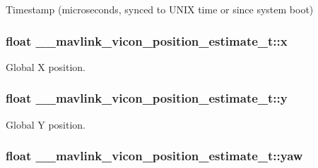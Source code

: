 Timestamp (microseconds, synced to U\+N\+I\+X time or since system boot) 

\hypertarget{struct____mavlink__vicon__position__estimate__t_a7a1c3ca07a59f990638cc4611214f2ad}{
\subsubsection[{x}]{\setlength{\rightskip}{0pt plus 5cm}float \+\_\+\+\_\+mavlink\+\_\+vicon\+\_\+position\+\_\+estimate\+\_\+t\+::x}}\label{struct____mavlink__vicon__position__estimate__t_a7a1c3ca07a59f990638cc4611214f2ad}


Global X position. 

\hypertarget{struct____mavlink__vicon__position__estimate__t_a78826f7765dd3b9d745d11d31a7bcf01}{
\subsubsection[{y}]{\setlength{\rightskip}{0pt plus 5cm}float \+\_\+\+\_\+mavlink\+\_\+vicon\+\_\+position\+\_\+estimate\+\_\+t\+::y}}\label{struct____mavlink__vicon__position__estimate__t_a78826f7765dd3b9d745d11d31a7bcf01}


Global Y position. 

\hypertarget{struct____mavlink__vicon__position__estimate__t_a0e0822aace81ee61ff76a034172e4a3c}{
\subsubsection[{yaw}]{\setlength{\rightskip}{0pt plus 5cm}float \+\_\+\+\_\+mavlink\+\_\+vicon\+\_\+position\+\_\+estimate\+\_\+t\+::yaw}}\label{struct____mavlink__vicon__position__estimate__t_a0e0822aace81ee61ff76a034172e4a3c}


